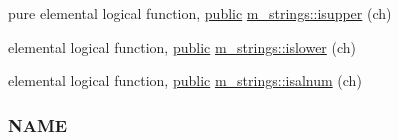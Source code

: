 \begin{DoxyCompactItemize}
\item 
pure elemental logical function, \hyperlink{M__stopwatch_83_8txt_a2f74811300c361e53b430611a7d1769f}{public} \hyperlink{namespacem__strings_ac98536a1b69026cd5373dfff489f7733}{m\+\_\+strings\+::isupper} (ch)
\item 
elemental logical function, \hyperlink{M__stopwatch_83_8txt_a2f74811300c361e53b430611a7d1769f}{public} \hyperlink{namespacem__strings_a9de5290748f02f575f3b7b859ff074ed}{m\+\_\+strings\+::islower} (ch)
\item 
elemental logical function, \hyperlink{M__stopwatch_83_8txt_a2f74811300c361e53b430611a7d1769f}{public} \hyperlink{namespacem__strings_ad8fd9bbf618bdba2c3ac9fb3c8174362}{m\+\_\+strings\+::isalnum} (ch)
\begin{DoxyCompactList}\small\item\em \subsubsection*{N\+A\+ME}


\end{DoxyCompactList}
\end{DoxyCompactItemize}

